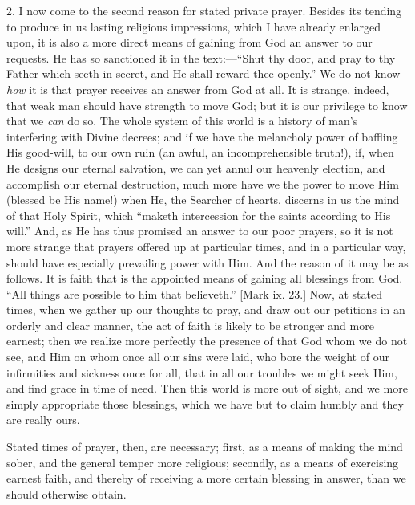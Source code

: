 2. I now come to the second reason for stated private
prayer. Besides its tending to produce in us lasting
religious impressions, which I have already enlarged
upon, it is also a more direct means of gaining from God
an answer to our requests. He has so sanctioned it in the
text:—``Shut thy door, and pray to thy Father
which seeth in secret, and He shall reward thee
openly.'' We do not know \emph{how} it is that prayer
receives an answer from God at all. It is strange,
indeed, that weak man should have strength to move God;
but it is our privilege to know that we \emph{can} do so.
The whole system of this world is a history of man's
interfering with Divine decrees; and if we have the
melancholy power of baffling His good-will, to our own
ruin (an awful, an incomprehensible truth!), if, when He
designs our eternal salvation, we can yet annul our
heavenly election, and accomplish our eternal
destruction, much more have we the power to move Him
(blessed be His name!) when He, the Searcher of hearts,
discerns in us the mind of that Holy Spirit, which
``maketh intercession for the saints according to His
will.'' And, as He has thus promised an answer to our
poor prayers, so it is not more strange that prayers
offered up at particular times, and in a particular way, should have especially prevailing power with Him. And the
reason of it may be as follows. It is faith that is the
appointed means of gaining all blessings from God.
``All things are possible to him that
believeth.'' [Mark ix. 23.] Now, at stated times,
when we gather up our thoughts to pray, and draw out our
petitions in an orderly and clear manner, the act of
faith is likely to be stronger and more earnest; then we
realize more perfectly the presence of that God whom we
do not see, and Him on whom once all our sins were laid,
who bore the weight of our infirmities and sickness once
for all, that in all our troubles we might seek Him, and
find grace in time of need. Then this world is more out
of sight, and we more simply appropriate those blessings,
which we have but to claim humbly and they are really
ours.

Stated times of prayer, then, are necessary; first, as
a means of making the mind sober, and the general temper
more religious; secondly, as a means of exercising
earnest faith, and thereby of receiving a more certain
blessing in answer, than we should otherwise obtain.

